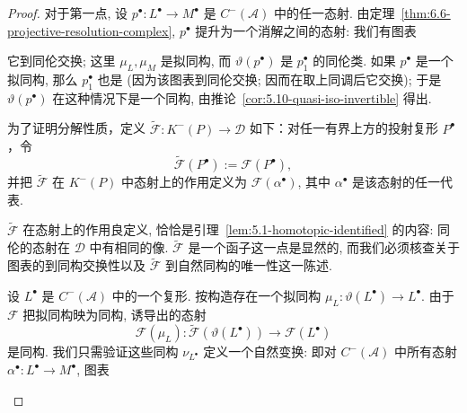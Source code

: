 \begin{proof}
对于第一点, 设 $p^\bullet:L^\bullet\to M^\bullet$ 是 $C^{-}(\mathcal{A})$ 中的任一态射. 由定理~\ref{thm:6.6-projective-resolution-complex}, $p^\bullet$ 提升为一个消解之间的态射: 我们有图表

\begin{center}
\end{center}

\noindent 它到同伦交换; 这里 $\mu_L,\mu_M$ 是拟同构, 而 $\vartheta(p^\bullet)$ 是 $p_1^\bullet$ 的同伦类. 如果 $p^\bullet$ 是一个拟同构, 那么 $p_1^\bullet$ 也是 (因为该图表到同伦交换; 因而在取上同调后它交换); 于是 $\vartheta(p^\bullet)$ 在这种情况下是一个同构, 由推论~\ref{cor:5.10-quasi-iso-invertible} 得出.

为了证明分解性质，定义 $\widetilde{\mathcal F}:K^{-}(P)\to\mathcal D$ 如下：对任一有界上方的投射复形 $P^\bullet$，令
\[
\widetilde{\mathcal F}(P^\bullet):=\mathcal F(P^\bullet),
\]
并把 $\widetilde{\mathcal F}$ 在 $K^{-}(P)$ 中态射上的作用定义为 $\mathcal F(\alpha^\bullet)$, 其中 $\alpha^\bullet$ 是该态射的任一代表.

$\widetilde{\mathcal F}$ 在态射上的作用良定义, 恰恰是引理~\ref{lem:5.1-homotopic-identified} 的内容: 同伦的态射在 $\mathcal{D}$ 中有相同的像. $\widetilde{\mathcal F}$ 是一个函子这一点是显然的, 而我们必须核查关于图表的到同构交换性以及 $\widetilde{\mathcal F}$ 到自然同构的唯一性这一陈述.

设 $L^\bullet$ 是 $C^{-}(\mathcal{A})$ 中的一个复形. 按构造存在一个拟同构 $\mu_L:\vartheta(L^\bullet)\to L^\bullet$. 由于 $\mathcal{F}$ 把拟同构映为同构, 诱导出的态射
\[
\mathcal F(\mu_L):\widetilde{\mathcal F}(\vartheta(L^\bullet))\longrightarrow\mathcal F(L^\bullet)
\]
是同构. 我们只需验证这些同构 $\nu_{L^\bullet}$ 定义一个自然变换: 即对 $C^{-}(\mathcal{A})$ 中所有态射 $\alpha^\bullet:L^\bullet\to M^\bullet$, 图表

\begin{center}
\end{center}


\end{proof}
